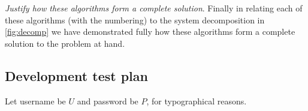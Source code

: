 \vspace{0.2cm}
\textit{Justify how these algorithms form a complete solution}.
Finally in relating each of these algorithms (with the
numbering) to the system decomposition in \ref{fig:decomp}
we have demonstrated fully how these algorithms form a
complete solution to the problem at hand.

\subsection{Development test plan}

%

Let username be $U$ and password be $P$, for
typographical reasons.



